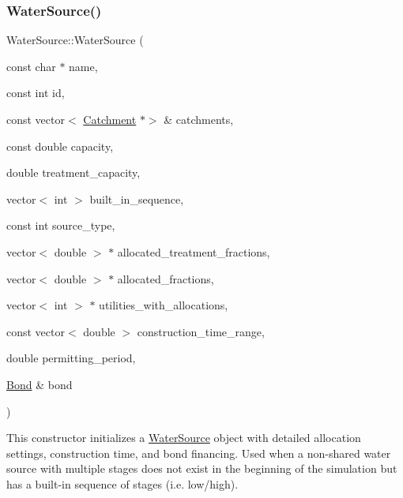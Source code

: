 \subsubsection{\texorpdfstring{Water\+Source()}{WaterSource()}\hspace{0.1cm}{\footnotesize\ttfamily [5/8]}}
{\footnotesize\ttfamily Water\+Source\+::\+Water\+Source (\begin{DoxyParamCaption}\item[{const char $\ast$}]{name,  }\item[{const int}]{id,  }\item[{const vector$<$ \mbox{\hyperlink{classCatchment}{Catchment}} $\ast$$>$ \&}]{catchments,  }\item[{const double}]{capacity,  }\item[{double}]{treatment\+\_\+capacity,  }\item[{vector$<$ int $>$}]{built\+\_\+in\+\_\+sequence,  }\item[{const int}]{source\+\_\+type,  }\item[{vector$<$ double $>$ $\ast$}]{allocated\+\_\+treatment\+\_\+fractions,  }\item[{vector$<$ double $>$ $\ast$}]{allocated\+\_\+fractions,  }\item[{vector$<$ int $>$ $\ast$}]{utilities\+\_\+with\+\_\+allocations,  }\item[{const vector$<$ double $>$}]{construction\+\_\+time\+\_\+range,  }\item[{double}]{permitting\+\_\+period,  }\item[{\mbox{\hyperlink{classBond}{Bond}} \&}]{bond }\end{DoxyParamCaption})}



This constructor initializes a {\ttfamily \mbox{\hyperlink{classWaterSource}{Water\+Source}}} object with detailed allocation settings, construction time, and bond financing. Used when a non-\/shared water source with multiple stages does not exist in the beginning of the simulation but has a built-\/in sequence of stages (i.\+e. low/high). 


